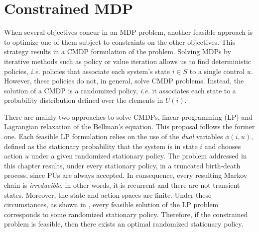 \section{Constrained MDP}\label{sec:Constrained MDP}
When several objectives concur in an MDP problem, another feasible approach is to optimize one of them subject to constraints on the other objectives. This strategy results in a CMDP formulation of the problem. Solving MDPs by iterative methods such as policy or value iteration allows us to find deterministic policies, \textit{i.e.} policies that associate each system's state $i \in S$ to a single control $u$.
However, these policies do not, in general, solve CMDP problems. Instead, the solution of a CMDP is a randomized policy, \textit{i.e.} it associates each state to a probability distribution defined over the elements in $U(i)$.

There are mainly two approaches to solve CMDPs, linear programming (LP) and Lagrangian relaxation of the Bellman's equation. This proposal follows the former one. Each feasible LP formulation relies on the use of the \textit{dual} variables $\phi\left(i,u\right)$, defined as the stationary probability that the system is in state $i$ and chooses action $u$ under a given randomized stationary policy. The problem addressed in this chapter results, under every stationary policy, in a truncated birth-death process, since PUs are always accepted. In consequence, every resulting Markov chain is \textit{irreducible}, in other words, it is recurrent and there are not transient states. Moreover, the state and action spaces are finite.
Under these circumstances, as shown in \cite{ref:Puterman2005}, every feasible solution of the LP problem corresponds to some randomized stationary policy. Therefore, if the constrained problem is feasible, then there exists an optimal randomized stationary policy.

